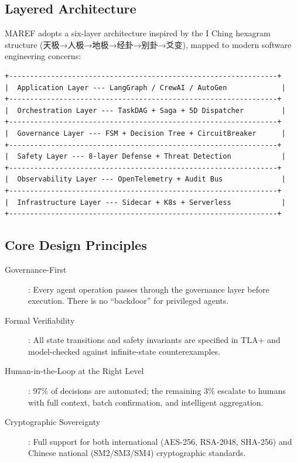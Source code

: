 \documentclass[11pt,a4paper]{article}
\begin{document}
\subsection{Layered Architecture}

MAREF adopts a six-layer architecture inspired by the I Ching hexagram structure (天极→人极→地极→经卦→别卦→爻变), mapped to modern software engineering concerns:

\begin{verbatim}
+----------------------------------------------------------------+
|  Application Layer --- LangGraph / CrewAI / AutoGen             |
+----------------------------------------------------------------+
|  Orchestration Layer --- TaskDAG + Saga + 5D Dispatcher         |
+----------------------------------------------------------------+
|  Governance Layer --- FSM + Decision Tree + CircuitBreaker      |
+----------------------------------------------------------------+
|  Safety Layer --- 8-layer Defense + Threat Detection            |
+----------------------------------------------------------------+
|  Observability Layer --- OpenTelemetry + Audit Bus              |
+----------------------------------------------------------------+
|  Infrastructure Layer --- Sidecar + K8s + Serverless            |
+----------------------------------------------------------------+
\end{verbatim}

\subsection{Core Design Principles}

\begin{description}
  \item[Governance-First]: Every agent operation passes through the governance layer before execution. There is no ``backdoor'' for privileged agents.
  \item[Formal Verifiability]: All state transitions and safety invariants are specified in TLA+ and model-checked against infinite-state counterexamples.
  \item[Human-in-the-Loop at the Right Level]: 97\% of decisions are automated; the remaining 3\% escalate to humans with full context, batch confirmation, and intelligent aggregation.
  \item[Cryptographic Sovereignty]: Full support for both international (AES-256, RSA-2048, SHA-256) and Chinese national (SM2/SM3/SM4) cryptographic standards.
\end{description}
\end{document}
